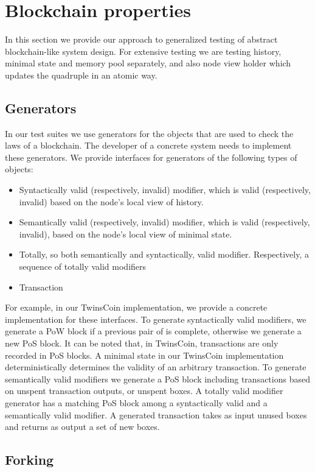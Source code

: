 
\section{Blockchain properties}
\label{sec:props}

In this section we provide our approach to generalized testing of abstract blockchain-like system design. For extensive testing we are  testing history, minimal state and memory pool separately, and also node view holder which updates the quadruple {\em <history, minimal state, vault, memory pool>} in an atomic way.


\subsection{Generators}

In our test suites we use generators for the objects that are used to check the laws of a blockchain. The developer of a concrete system needs to implement these generators. We provide interfaces for generators of the following types of objects:

\begin{itemize}
	\item{Syntactically valid (respectively, invalid) modifier, which is valid (respectively, invalid) based on the node's local view of history.}
	\item{Semantically valid (respectively, invalid) modifier, which is valid (respectively, invalid), based on the node's local view of minimal state.}
	\item{Totally, so both semantically and syntactically, valid modifier. Respectively, a sequence of totally valid modifiers}
	\item{Transaction}
\end{itemize}

For example, in our TwinsCoin implementation, we provide a concrete implementation for these interfaces. To generate syntactically valid modifiers, we generate a PoW block if a previous pair of {\em<PoW block, PoS block>} is complete, otherwise we generate a new PoS block. It can be noted that, in TwinsCoin, transactions are only recorded in PoS blocks. A minimal state in our TwinsCoin implementation deterministically determines the validity of an arbitrary transaction. To generate semantically valid modifiers we generate a PoS block including transactions based on unspent transaction outputs, or unspent boxes. A totally valid modifier generator has a matching PoS block among a syntactically valid and a semantically valid modifier. A generated transaction takes as input unused boxes and returns as output a set of new boxes.

\subsection{Forking}


